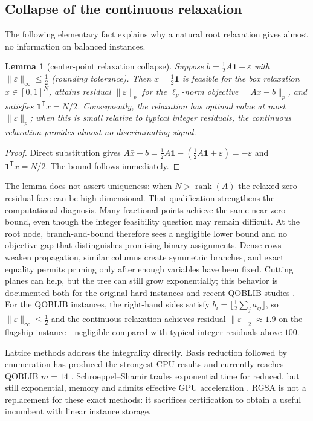\documentclass[11pt]{article}
\newtheorem{lemma}{Lemma}
\begin{document}
\subsection{Collapse of the continuous relaxation}
The following elementary fact explains why a natural root relaxation gives almost no information on balanced instances.

\begin{lemma}[center-point relaxation collapse]\label{lem:collapse}
Suppose $b=\tfrac12A\mathbf{1}+\varepsilon$ with $\|\varepsilon\|_\infty\le\tfrac12$ (rounding tolerance). Then $\bar{x}=\tfrac12\mathbf{1}$ is feasible for the box relaxation $x\in[0,1]^N$, attains residual $\|\varepsilon\|_p$ for the $\ell_p$-norm objective $\|Ax-b\|_p$, and satisfies $\mathbf{1}^{\mathsf T}\bar{x}=N/2$. Consequently, the relaxation has optimal value at most $\|\varepsilon\|_p$; when this is small relative to typical integer residuals, the continuous relaxation provides almost no discriminating signal.
\end{lemma}
\begin{proof}
Direct substitution gives
$A\bar{x}-b=\tfrac12A\mathbf{1}-(\tfrac12A\mathbf{1}+\varepsilon)=-\varepsilon$ and
$\mathbf{1}^{\mathsf T}\bar{x}=N/2$. The bound follows immediately.
\end{proof}

The lemma does not assert uniqueness: when $N>\operatorname{rank}(A)$ the relaxed zero-residual face can be high-dimensional. That qualification strengthens the computational diagnosis. Many fractional points achieve the same near-zero bound, even though the integer feasibility question may remain difficult. At the root node, branch-and-bound therefore sees a negligible lower bound and no objective gap that distinguishes promising binary assignments. Dense rows weaken propagation, similar columns create symmetric branches, and exact equality permits pruning only after enough variables have been fixed. Cutting planes can help, but the tree can still grow exponentially; this behavior is documented both for the original hard instances and recent QOBLIB studies \cite{cornuejols1998,vogel2012,wassermann2026}. For the QOBLIB instances, the right-hand sides satisfy $b_i=\lfloor\tfrac12\sum_j a_{ij}\rfloor$, so $\|\varepsilon\|_\infty\le\tfrac12$ and the continuous relaxation achieves residual $\|\varepsilon\|_2\approx1.9$ on the flagship instance---negligible compared with typical integer residuals above $100$.

Lattice methods address the integrality directly. Basis reduction followed by enumeration has produced the strongest CPU results and currently reaches QOBLIB $m=14$ \cite{aardal1999,wassermann2002,wassermann2021,wassermann2026}. Schroeppel--Shamir trades exponential time for reduced, but still exponential, memory and admits effective GPU acceleration \cite{kempkekoch2026}. RGSA is not a replacement for these exact methods: it sacrifices certification to obtain a useful incumbent with linear instance storage.
\end{document}
